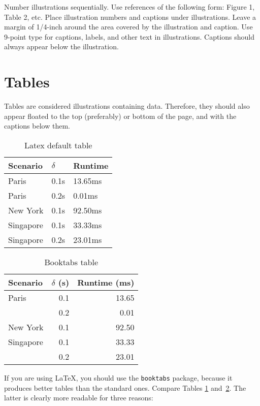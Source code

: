 \documentclass{article}
\begin{document}
Number illustrations sequentially. Use references of the following
form: Figure 1, Table 2, etc. Place illustration numbers and captions
under illustrations. Leave a margin of 1/4-inch around the area
covered by the illustration and caption.  Use 9-point type for
captions, labels, and other text in illustrations. Captions should always appear below the illustration.

\section{Tables}

Tables are considered illustrations containing data. Therefore, they should also appear floated to the top (preferably) or bottom of the page, and with the captions below them.

\begin{table}
\centering
\begin{tabular}{lll}
\hline
Scenario  & $\delta$ & Runtime \\
\hline
Paris       & 0.1s  & 13.65ms     \\
Paris       & 0.2s  & 0.01ms      \\
New York    & 0.1s  & 92.50ms     \\
Singapore   & 0.1s  & 33.33ms     \\
Singapore   & 0.2s  & 23.01ms     \\
\hline
\end{tabular}
\caption{Latex default table}
\label{tab:plain}
\end{table}

\begin{table}
\centering
\begin{tabular}{lrr}
\toprule
Scenario  & $\delta$ (s) & Runtime (ms) \\
\midrule
Paris       & 0.1  & 13.65      \\
            & 0.2  & 0.01       \\
New York    & 0.1  & 92.50      \\
Singapore   & 0.1  & 33.33      \\
            & 0.2  & 23.01      \\
\bottomrule
\end{tabular}
\caption{Booktabs table}
\label{tab:booktabs}
\end{table}

If you are using \LaTeX, you should use the {\tt booktabs} package, because it produces better tables than the standard ones. Compare Tables \ref{tab:plain} and~\ref{tab:booktabs}. The latter is clearly more readable for three reasons:
\end{document}

